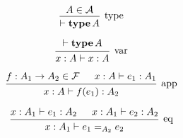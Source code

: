 \documentclass[12pt]{article}
\begin{document}
\pagestyle{empty}

\[
  \begin{prooftree}
    \hypo{A \in \mathcal{A}}
    \infer1[type]{\vdash \mathop{\mathbf{type}} A}
  \end{prooftree}
\]

\[
  \begin{prooftree}
    \hypo{\vdash \mathop{\mathbf{type}} A}
    \infer1[var]{x: A \vdash x: A}
  \end{prooftree}
\]

\[
  \begin{prooftree}
    \hypo{f: A_1 \to A_2 \in \mathcal{F}}
    \hypo{x: A \vdash e_1: A_1}
    \infer2[app]{x: A \vdash f(e_1): A_2}
  \end{prooftree}
\]

\[
  \begin{prooftree}
    \hypo{x: A_1 \vdash e_1: A_2}
    \hypo{x: A_1 \vdash e_2: A_2}
    \infer2[eq]{x: A_1 \vdash e_1 =_{A_2} e_2}
  \end{prooftree}
\]
\end{document}
